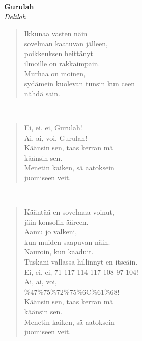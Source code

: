 %
%
\noindent\begin{minipage}{\linewidth}
\vspace{5pt}
\parbox[t]{0.85\linewidth}{\raggedright {\large\bf Gurulah}\\[2pt]\small\emph{Delilah}\\[6pt]}
\begin{verse}
	
	Ikkunaa vasten näin\\
	sovelman kaatuvan jälleen,\\
	poikkeuksen heittänyt\\
	ilmoille on rakkaimpain.\\
	Murhaa on moinen,\\
	sydämein kuolevan tunsin kun ceen\\
	nähdä sain.\\
\end{verse}
\end{minipage}\\[10pt]
\noindent\begin{minipage}{\linewidth}
\begin{verse}
	Ei, ei, ei, Gurulah!\\
	Ai, ai, voi, Gurulah!\\
	Käänsin sen, taas kerran mä\\
	käänsin sen.\\
	Menetin kaiken, sä aatoksein\\
	juomiseen veit.\\
\end{verse}
\end{minipage}\\[10pt]
\noindent\begin{minipage}{\linewidth}
\begin{verse}
	Kääntää en sovelmaa voinut,\\
	jäin konsolin ääreen.\\
	Aamu jo valkeni,\\
	kun muiden saapuvan näin.\\
	Nauroin, kun kaaduit.\\
	Tuskani vallassa hillinnyt en itseäin.\\
	Ei, ei, ei, 71 117 114 117 108 97 104!\\
	Ai, ai, voi,\\
	\%47\%75\%72\%75\%6C\%61\%68!\\
	Käänsin sen, taas kerran mä\\
	käänsin sen.\\
	Menetin kaiken, sä aatoksein\\
	juomiseen veit.\\
\end{verse}
\end{minipage}\\[10pt]
